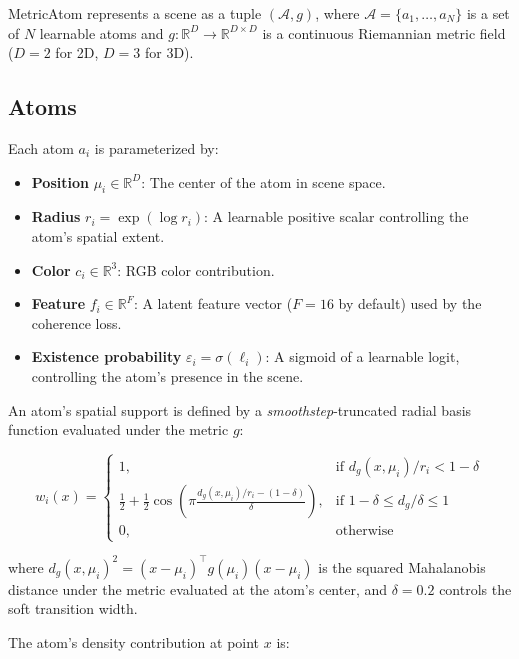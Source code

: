 \documentclass[11pt]{article}
\begin{document}
MetricAtom represents a scene as a tuple $(\mathcal{A}, g)$, where $\mathcal{A} = \{a_1, \ldots, a_N\}$ is a set of $N$ learnable atoms and $g: \mathbb{R}^D \to \mathbb{R}^{D \times D}$ is a continuous Riemannian metric field ($D=2$ for 2D, $D=3$ for 3D).

\subsection{Atoms}

Each atom $a_i$ is parameterized by:

\begin{itemize}
    \item \textbf{Position} $\mu_i \in \mathbb{R}^D$: The center of the atom in scene space.
    \item \textbf{Radius} $r_i = \exp(\log r_i)$: A learnable positive scalar controlling the atom's spatial extent.
    \item \textbf{Color} $c_i \in \mathbb{R}^3$: RGB color contribution.
    \item \textbf{Feature} $f_i \in \mathbb{R}^F$: A latent feature vector ($F=16$ by default) used by the coherence loss.
    \item \textbf{Existence probability} $\varepsilon_i = \sigma(\ell_i)$: A sigmoid of a learnable logit, controlling the atom's presence in the scene.
\end{itemize}

An atom's spatial support is defined by a \emph{smoothstep}-truncated radial basis function evaluated under the metric $g$:

\begin{equation}
    w_i(x) = \begin{cases}
        1, & \text{if } d_{g}(x, \mu_i) / r_i < 1 - \delta \\
        \frac{1}{2} + \frac{1}{2}\cos\left(\pi \frac{d_g(x, \mu_i)/r_i - (1-\delta)}{\delta}\right), & \text{if } 1-\delta \leq d_g/\delta \leq 1 \\
        0, & \text{otherwise}
    \end{cases}
\end{equation}

where $d_g(x, \mu_i)^2 = (x - \mu_i)^\top g(\mu_i) (x - \mu_i)$ is the squared Mahalanobis distance under the metric evaluated at the atom's center, and $\delta = 0.2$ controls the soft transition width.

The atom's density contribution at point $x$ is:
\end{document}
